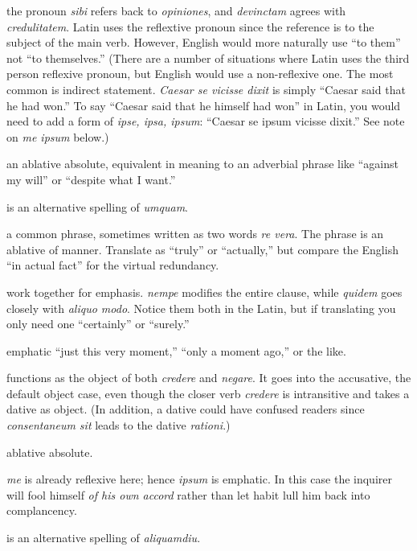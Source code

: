  the pronoun \textit{sibi} refers back to \textit{opiniones}, and \textit{devinctam} agrees with \textit{credulitatem}. Latin uses the reflextive pronoun since the reference is to the subject of the main verb. However, English would more naturally use ``to them'' not ``to themselves.'' (There are a number of situations where Latin uses the third person reflexive pronoun, but English would use a non-reflexive one. The most common is indirect statement. \textit{Caesar se vicisse dixit} is simply ``Caesar said that he had won.'' To say ``Caesar said that he himself had won'' in Latin, you would need to add a form of \textit{ipse, ipsa, ipsum}: ``Caesar se ipsum vicisse dixit.'' See note on \textit{me ipsum} below.)

 an ablative absolute, equivalent in meaning to an adverbial phrase like ``against my will'' or ``despite what I want.''

 is an alternative spelling of \textit{umquam}.

 a common phrase, sometimes written as two words \textit{re vera}. The phrase is an ablative of manner. Translate as ``truly'' or ``actually,'' but compare the English ``in actual fact'' for the virtual redundancy.

 work together for emphasis. \textit{nempe} modifies the entire clause, while \textit{quidem} goes closely with \textit{aliquo modo}. Notice them both in the Latin, but if translating you only need one ``certainly'' or ``surely.''

 emphatic ``just this very moment,'' ``only a moment ago,'' or the like.

 functions as the object of both \textit{credere} and \textit{negare}. It goes into the accusative, the default object case, even though the closer verb \textit{credere} is intransitive and takes a dative as object. (In addition, a dative could have confused readers since \textit{consentaneum sit} leads to the dative \textit{rationi}.)

 ablative absolute.

 \textit{me} is already reflexive here; hence \textit{ipsum} is emphatic. In this case the inquirer will fool himself \textit{of his own accord} rather than let habit lull him back into complancency.

 is an alternative spelling of \textit{aliquamdiu}. 

